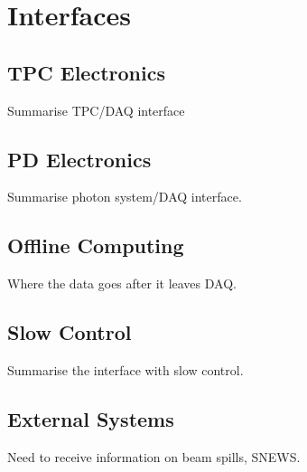 
\section{Interfaces}
\label{sec:fdsp-daq-intfc}



\subsection{TPC Electronics}
\label{sec:fdsp-daq-intfc-elec}

Summarise TPC/DAQ interface

\subsection{PD Electronics}
\label{sec:fdsp-daq-intfc-photon}

Summarise photon system/DAQ interface.

\subsection{Offline Computing}
\label{sec:fdsp-daq-intfc-fnal-cmptg}

Where the data goes after it leaves DAQ.

\subsection{Slow Control}
\label{sec:fdsp-daq-intfc-ext}

Summarise the interface with slow control.


\subsection{External Systems}
\label{sec:fdsp-daq-intfc-ext}

Need to receive information on beam spills, SNEWS.
